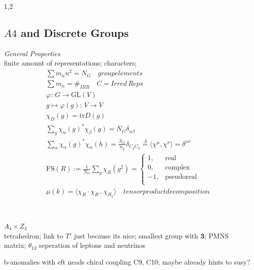 \documentclass[11pt,a4paper,twoside]{article}
\numberwithin{equation}{section}
\begin{document}
\begin{spacing}{1,2}
\subsection{$A4$ and Discrete Groups}
\label{sec_A4GT}
\textit{General Properties}\\
finite amount of representations; characters; 
 \begin{align}
  \sum m_n n^2 = N_G \quad groupelements\\
  \sum m_n = \#_{IRR} \quad C = Irred\,Reps\\
  \varphi:\, G\rightarrow \text{GL}(V)\\
  g\mapsto \varphi(g):\, V\rightarrow V\\
  \chi_D(g) = \text{tr}D(g)\\
  \sum_g \chi_\alpha(g)^*\chi_\beta(g) = N_G \delta_{\alpha\beta}\\
  \sum_\alpha \chi_\alpha(g)^*\chi_\alpha(h) = \frac{N_G}{n_g} \delta_{C_g C_h} \stackrel{\Lambda}{=} \langle \chi^\mu, \chi^\nu \rangle = \delta^{\mu\nu}\\
  \text{FS}(R) := \frac{1}{N_G} \sum_g \chi_R(g^2) =\begin{cases}
                                                     1, & \text{real}\\
                                                     0, & \text{complex}\\
                                                     -1, & \text{pseudoreal}\\
                                                    \end{cases}\\
  \mu(k) = \langle \chi_R \cdot \chi_{R'} , \chi_{R_k} \rangle \quad tensor product decomposition\\
 \end{align}
 \\ \\ \textit{$A_4\times Z_3$}\\
 tetrahedron; link to $T'$ just because its nice; smallest group with $\boldsymbol{3}$; PMNS matrix; $\theta_{13}$
 seperation of leptons and neutrinos


b-anomalies with eft neads chiral coupling C9, C10; maybe already hints to susy?


\end{spacing}
\end{document}
